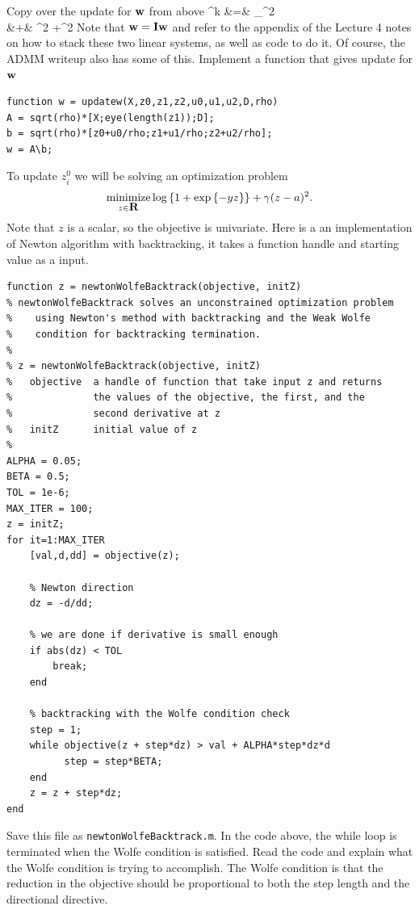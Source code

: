 \documentclass{article}
\begin{document}
{%
\newproblem{1pt} Copy over the update for $\mathbf{w}$ from above
\BEAS
\ww^k &=& \argmin_\ww  {}^2 \\
&+&   ^2
     +^2
\EEAS
Note that $\mathbf{w} = \mathbf{I}\mathbf{w}$ and refer to the appendix of the Lecture 4 notes on how to stack these two linear systems, as well as code to do it. Of course, the ADMM writeup also has some of this. Implement a function that gives update for $\mathbf{w}$
\begin{verbatim}
function w = updatew(X,z0,z1,z2,u0,u1,u2,D,rho)
A = sqrt(rho)*[X;eye(length(z1));D];
b = sqrt(rho)*[z0+u0/rho;z1+u1/rho;z2+u2/rho];
w = A\b;
\end{verbatim}

\newproblem{1pt}
To update $z^0_i$ we will be solving an optimization problem
\[
\mathop{\textrm{minimize}}_{z \in {\mbox{\bf R}}} \mathop{\rm log}\left\{1 + \mathop{\rm exp}\left\{-yz\right\}\right\} + \gamma(z - a)^2.
\]
Note that $z$ is a scalar, so the objective is univariate.
Here is a an implementation of Newton algorithm with backtracking, it takes a function handle and starting value as a input.


\begin{verbatim}
function z = newtonWolfeBacktrack(objective, initZ)
% newtonWolfeBacktrack solves an unconstrained optimization problem
%    using Newton's method with backtracking and the Weak Wolfe
%    condition for backtracking termination.
%
% z = newtonWolfeBacktrack(objective, initZ)
%   objective  a handle of function that take input z and returns
%              the values of the objective, the first, and the
%              second derivative at z
%   initZ      initial value of z
%
ALPHA = 0.05;
BETA = 0.5;
TOL = 1e-6;
MAX_ITER = 100;
z = initZ;
for it=1:MAX_ITER
    [val,d,dd] = objective(z);

    % Newton direction
    dz = -d/dd;

    % we are done if derivative is small enough
    if abs(dz) < TOL
        break;
    end

    % backtracking with the Wolfe condition check
    step = 1;
    while objective(z + step*dz) > val + ALPHA*step*dz*d
          step = step*BETA;
    end
    z = z + step*dz;
end
\end{verbatim}
Save this file as \texttt{newtonWolfeBacktrack.m}. In the code above, the while loop is terminated when the Wolfe condition is satisfied. Read the code and explain what the Wolfe condition is trying to accomplish. The Wolfe condition is that the reduction in the objective should be proportional to both the step length and the directional directive.

}
\end{document}

